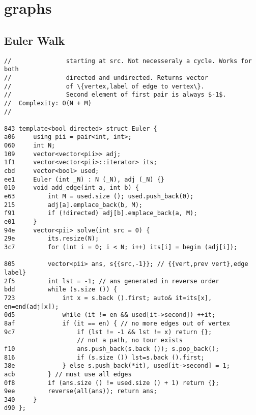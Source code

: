 \documentclass[11pt, a4paper, twoside]{article}
\begin{document}
%
%

\section{graphs}

\subsection{ Euler Walk}
\begin{lstlisting}
//               starting at src. Not necesseraly a cycle. Works for both 
//               directed and undirected. Returns vector 
//               of \{vertex,label of edge to vertex\}.
//               Second element of first pair is always $-1$.
//  Complexity: O(N + M)
//

843 template<bool directed> struct Euler {
a06     using pii = pair<int, int>;
060     int N;
109     vector<vector<pii>> adj; 
1f1     vector<vector<pii>::iterator> its; 
cbd     vector<bool> used;
ee1     Euler (int _N) : N (_N), adj (_N) {}
010     void add_edge(int a, int b) {
e63         int M = used.size (); used.push_back(0); 
215         adj[a].emplace_back(b, M); 
f91         if (!directed) adj[b].emplace_back(a, M);
e01     }
94e     vector<pii> solve(int src = 0) { 
29e         its.resize(N);
3c7         for (int i = 0; i < N; i++) its[i] = begin (adj[i]);
    
805         vector<pii> ans, s{{src,-1}}; // {{vert,prev vert},edge label}
2f5         int lst = -1; // ans generated in reverse order
bdd         while (s.size ()) { 
723             int x = s.back ().first; auto& it=its[x], en=end(adj[x]);
0d5             while (it != en && used[it->second]) ++it;
8af             if (it == en) { // no more edges out of vertex
9c7                 if (lst != -1 && lst != x) return {};
                    // not a path, no tour exists
f10                 ans.push_back(s.back ()); s.pop_back(); 
816                 if (s.size ()) lst=s.back ().first;
38e             } else s.push_back(*it), used[it->second] = 1;
acb         } // must use all edges
0f8         if (ans.size () != used.size () + 1) return {}; 
9ee         reverse(all(ans)); return ans;
340     }
d90 };
\end{lstlisting}
\end{document}
